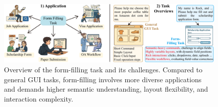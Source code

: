 \documentclass[sigconf, screen, review]{acmart}
\begin{document}

\begin{figure}[t]
    \centering
    \includegraphics[width=0.93\linewidth]{figs/fig1v1.pdf}
    \caption{Overview of the form-filling task and its challenges. Compared to general GUI tasks, form-filling involves more diverse applications and demands higher semantic understanding, layout flexibility, and interaction complexity.}
    \label{fig:fig1}
\end{figure}

\end{document}
